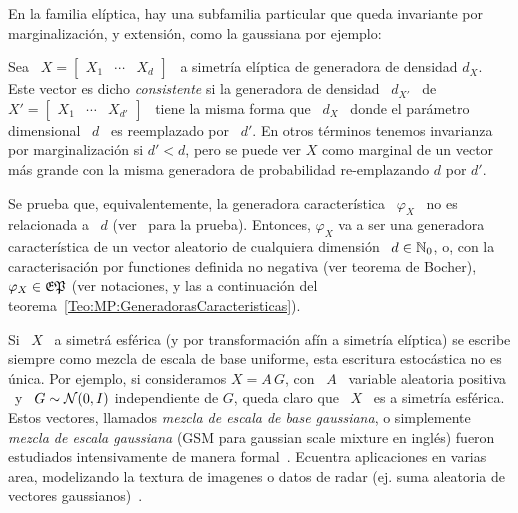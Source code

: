 En la familia el\'iptica, hay una subfamilia particular que queda invariante por
marginalizaci\'on, y extensi\'on, como la gaussiana por ejemplo:
%
\begin{definicion}
%
  Sea \  $X = \begin{bmatrix} X_1 &  \cdots & X_d \end{bmatrix}$  \ a simetr\'ia
  el\'iptica  de  generadora de  densidad  $d_X$.   Este  vector es  dicho  {\em
    consistente}   si  la   generadora  de   densidad  \   $d_{X'}$  \   de  $X'
  = \begin{bmatrix} X_1 & \cdots &  X_{d'} \end{bmatrix}$ \ tiene la misma forma
  que \ $d_X$  \ donde el par\'ametro  dimensional \ $d$ \ es  reemplazado por \
  $d'$.  En  otros t\'erminos tenemos  invarianza por marginalizaci\'on si  $d' <
  d$, pero se puede ver $X$ como marginal de un vector m\'as grande con la misma
  generadora de probabilidad re-emplazando $d$ por $d'$.

  Se prueba que, equivalentemente,  la generadora caracter\'istica \ $\varphi_X$
  \  no es  relacionada a  \ $d$  (ver~\cite{Kan94, FanKot90}  para  la prueba).
  Entonces, $\varphi_X$  va a ser  una generadora caracter\'istica de  un vector
  aleatorio   de  cualquiera   dimensi\'on  \   $d  \in   \mathbb{N}_0$,  o,   con  la
  caracterisaci\'on por functiones definida no negativa (ver teorema de Bocher),
  \  $\varphi_X  \in  \mathfrak{EP}$  (ver   notaciones,  y  las  a  continuaci\'on  del
  teorema~\ref{Teo:MP:GeneradorasCaracteristicas}).
\end{definicion}


Si \  $X$ \ a simetr\'a  esf\'erica (y por transformaci\'on  af\'in a simetr\'ia
el\'iptica)  se escribe siempre  como mezcla  de escala  de base  uniforme, esta
escritura estoc\'astica  no es \'unica. Por  ejemplo, si consideramos $X  = A \,
G$, con \ $A$ \ variable aleatoria positiva \ y \ $G \sim \mathcal{N}(0,I)$ independiente
de $G$,  queda claro  que \ $X$  \ es  a simetr\'ia esf\'erica.  Estos vectores,
llamados {\em mezcla de escala de  base gaussiana}, o simplemente {\em mezcla de
  escala  gaussiana}  (GSM  para  gaussian  scale mixture  en  ingl\'es)  fueron
estudiados  intensivamente de  manera formal~\cite{Kan94,  Yao73,  Ver64, Pic70,
  Kel71,  Kin72, KeiSte74,  Tei60, AndMal74}.   Ecuentra aplicaciones  en varias
area, modelizando la  textura de imagenes o datos de  radar (ej.  suma aleatoria
de  vectores gaussianos)~\cite{PorStr03,  BomBea08,  Sel08, ShiSel07,  ZozVig10,
  TisNic04, TodTab07}.

